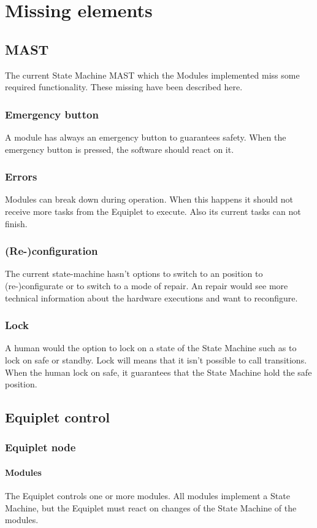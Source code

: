 \section{Missing elements}
\subsection{MAST}
The current State Machine MAST which the Modules implemented miss some required functionality. These missing have been described here.
\subsubsection{Emergency button}
A module has always an emergency button to guarantees safety. When the emergency button is pressed, the software should react on it.
\subsubsection{Errors}
Modules can break down during operation. When this happens it should not receive more tasks from the Equiplet to execute. Also its current tasks can not finish.
\subsubsection{(Re-)configuration}
The current state-machine hasn't options to switch to an position to (re-)configurate or to switch to a mode of repair. An repair would see more technical information about the hardware executions and want to reconfigure.
\subsubsection{Lock}
A human would the option to lock on a state of the State Machine such as to lock on safe or standby. Lock will means that it isn't possible to call transitions. When the human lock on safe, it guarantees that the State Machine hold the safe position.

\subsection{Equiplet control}
\subsubsection{Equiplet node}
\paragraph{Modules}The Equiplet controls one or more modules. All modules implement a State Machine, but the Equiplet must react on changes of the State Machine of the modules.
